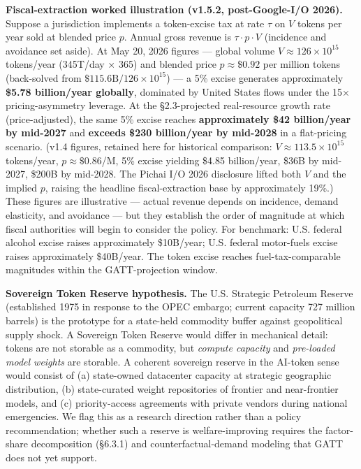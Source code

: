 \documentclass[11pt,a4paper]{article}
\begin{document}
\textbf{Fiscal-extraction worked illustration (v1.5.2, post-Google-I/O 2026).} Suppose a jurisdiction implements a token-excise tax at rate $\tau$ on $V$ tokens per year sold at blended price $p$. Annual gross revenue is $\tau \cdot p \cdot V$ (incidence and avoidance set aside). At May 20, 2026 figures --- global volume $V \approx 126 \times 10^{15}$ tokens/year (345T/day × 365) and blended price $p \approx \$0.92$ per million tokens (back-solved from $\$115.6\text{B} / 126 \times 10^{15}$) --- a 5\% excise generates approximately \textbf{\$5.78 billion/year globally}, dominated by United States flows under the 15× pricing-asymmetry leverage. At the §2.3-projected real-resource growth rate (price-adjusted), the same 5\% excise reaches \textbf{approximately \$42 billion/year by mid-2027} and \textbf{exceeds \$230 billion/year by mid-2028} in a flat-pricing scenario. (v1.4 figures, retained here for historical comparison: $V \approx 113.5 \times 10^{15}$ tokens/year, $p \approx \$0.86$/M, 5\% excise yielding \$4.85 billion/year, \$36B by mid-2027, \$200B by mid-2028. The Pichai I/O 2026 disclosure \cite{pichai2026io} lifted both $V$ and the implied $p$, raising the headline fiscal-extraction base by approximately 19\%.) These figures are illustrative --- actual revenue depends on incidence, demand elasticity, and avoidance --- but they establish the order of magnitude at which fiscal authorities will begin to consider the policy. For benchmark: U.S. federal alcohol excise raises approximately \$10B/year; U.S. federal motor-fuels excise raises approximately \$40B/year. The token excise reaches fuel-tax-comparable magnitudes within the GATT-projection window.

\textbf{Sovereign Token Reserve hypothesis.} The U.S. Strategic Petroleum Reserve (established 1975 in response to the OPEC embargo; current capacity 727 million barrels) is the prototype for a state-held commodity buffer against geopolitical supply shock. A Sovereign Token Reserve would differ in mechanical detail: tokens are not storable as a commodity, but \emph{compute capacity} and \emph{pre-loaded model weights} are storable. A coherent sovereign reserve in the AI-token sense would consist of (a) state-owned datacenter capacity at strategic geographic distribution, (b) state-curated weight repositories of frontier and near-frontier models, and (c) priority-access agreements with private vendors during national emergencies. We flag this as a research direction rather than a policy recommendation; whether such a reserve is welfare-improving requires the factor-share decomposition (§6.3.1) and counterfactual-demand modeling that GATT does not yet support.
\end{document}
